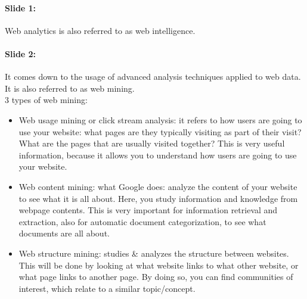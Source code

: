 \documentclass[10pt,a4paper]{report}
\begin{document}
\paragraph{Slide 1:}Web analytics is also referred to as web intelligence.

\paragraph{Slide 2:}It comes down to the usage of advanced analysis techniques applied to web data. It is also referred to as web mining.\\
3 types of web mining:
\begin{itemize}
\item Web usage mining or click stream analysis: it refers to how users are going to use your website: what pages are they typically visiting as part of their visit? What are the pages that are usually visited together? This is very useful information, because it allows you to understand how users are going to use your website.
\item Web content mining: what Google does: analyze the content of your website to see what it is all about. Here, you study information and knowledge from webpage contents. This is very important for information retrieval and extraction, also for automatic document categorization, to see what documents are all about.
\item Web structure mining: studies \& analyzes the structure between websites. This will be done by looking at what website links to what other website, or what page links to another page. By doing so, you can find communities of interest, which relate to a similar topic/concept.
\end{itemize}
\end{document}
